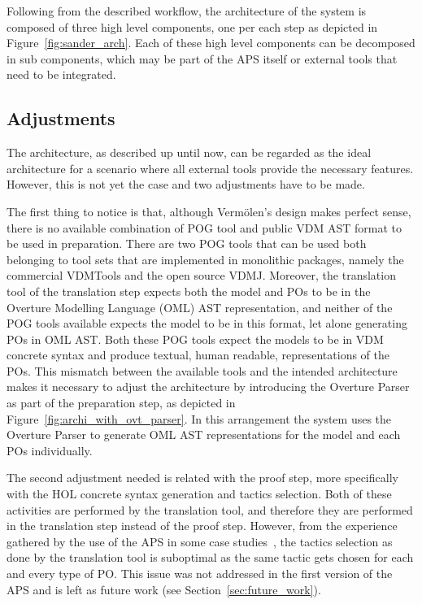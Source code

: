 \documentclass[]{article}
\begin{document}
Following from the described workflow, the architecture of the system is composed of three high level components, one per each step as depicted in Figure~\ref{fig:sander_arch}.
Each of these high level components can be decomposed in sub components, which may be part of the APS itself or external tools that need to be integrated.


\subsection{Adjustments}
\label{sub:adjustments}

The architecture, as described up until now, can be regarded as the ideal architecture for a scenario where all external tools provide the necessary features.
However, this is not yet the case and two adjustments have to be made.

The first thing to notice is that, although Verm\"olen's design makes perfect sense, there is no available combination of POG tool and public VDM AST format to be used in preparation.
There are two POG tools that can be used both belonging to tool sets that are implemented in monolithic packages, namely the commercial VDMTools and the open source VDMJ.
Moreover, the translation tool of the translation step expects both the model and POs to be in the Overture Modelling Language (OML) AST representation, and neither of the POG tools available expects the model to be in this format, let alone generating POs in OML AST.
Both these POG tools expect the models to be in VDM concrete syntax and produce textual, human readable, representations of the POs.
This mismatch between the available tools and the intended architecture makes it necessary to adjust the architecture by introducing the Overture Parser as part of the preparation step, as depicted in Figure~\ref{fig:archi_with_ovt_parser}.
In this arrangement the system uses the Overture Parser to generate OML AST representations for the model and each POs individually.

The second adjustment needed is related with the proof step, more specifically with the HOL concrete syntax generation and tactics selection.
Both of these activities are performed by the translation tool, and therefore they are performed in the translation step instead of the proof step.
However, from the experience gathered by the use of the APS in some case studies~\cite{MiguelMSc,SBMF09paper}, the tactics selection as done by the translation tool is suboptimal as the same tactic gets chosen for each and every type of PO.
This issue was not addressed in the first version of the APS and is left as future work (see Section~\ref{sec:future_work}).
\end{document}
